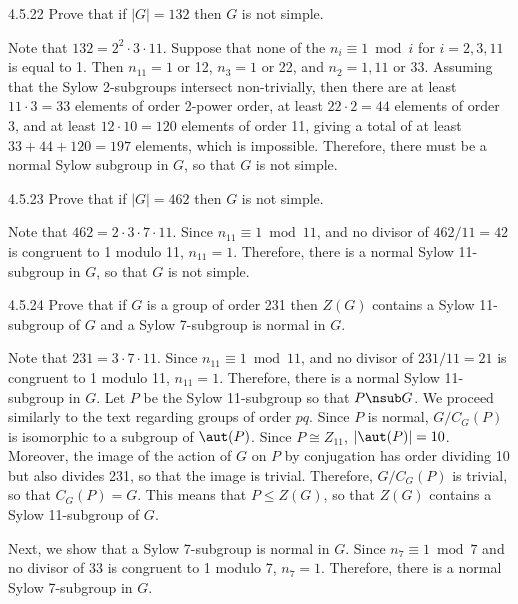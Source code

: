 \begin{exercise}{4.5.22}
	Prove that if $|G| = 132$ then $G$ is not simple.
\end{exercise}

\begin{sol}
	Note that $132 = 2^2 \cdot 3 \cdot 11$.
	Suppose that none of the $n_i \equiv 1 \bmod i$ for $i = 2, 3, 11$ is equal to 1.
	Then $n_{11} = 1$ or 12, $n_3 = 1$ or 22, and $n_2 = 1, 11$ or 33.
	Assuming that the Sylow 2-subgroups intersect non-trivially, then there are at least $11 \cdot 3 = 33$ elements of order 2-power order, at least $22 \cdot 2 = 44$ elements of order 3, and at least $12 \cdot 10 = 120$ elements of order 11, giving a total of at least $33 + 44 + 120 = 197$ elements, which is impossible.
	Therefore, there must be a normal Sylow subgroup in $G$, so that $G$ is not simple.
\end{sol}

\begin{exercise}{4.5.23}
	Prove that if $|G| = 462$ then $G$ is not simple.
\end{exercise}

\begin{sol}
	Note that $462 = 2 \cdot 3 \cdot 7 \cdot 11$.
	Since $n_{11} \equiv 1 \bmod 11$, and no divisor of $462/11 = 42$ is congruent to 1 modulo 11, $n_{11} = 1$.
	Therefore, there is a normal Sylow 11-subgroup in $G$, so that $G$ is not simple.
\end{sol}

\begin{exercise}{4.5.24}
	Prove that if $G$ is a group of order 231 then $Z(G)$ contains a Sylow 11-subgroup of $G$ and a Sylow 7-subgroup is normal in $G$.
\end{exercise}

\begin{sol}
	Note that $231 = 3 \cdot 7 \cdot 11$.
	Since $n_{11} \equiv 1 \bmod 11$, and no divisor of $231/11 = 21$ is congruent to 1 modulo 11, $n_{11} = 1$.
	Therefore, there is a normal Sylow 11-subgroup in $G$.
	Let $P$ be the Sylow 11-subgroup so that $P \nsub G$.
	We proceed similarly to the text regarding groups of order $pq$.
	Since $P$ is normal, $G/C_G(P)$ is isomorphic to a subgroup of $\aut(P)$.
	Since $P \cong Z_{11}$, $|\aut(P)| = 10$.
	Moreover, the image of the action of $G$ on $P$ by conjugation has order dividing 10 but also divides 231, so that the image is trivial.
	Therefore, $G/C_G(P)$ is trivial, so that $C_G(P) = G$.
	This means that $P \leq Z(G)$, so that $Z(G)$ contains a Sylow 11-subgroup of $G$.

	Next, we show that a Sylow 7-subgroup is normal in $G$.
	Since $n_7 \equiv 1 \bmod 7$ and no divisor of 33 is congruent to 1 modulo 7, $n_7 = 1$.
	Therefore, there is a normal Sylow 7-subgroup in $G$.
\end{sol}

